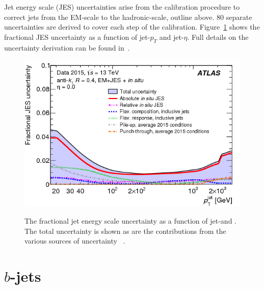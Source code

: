 Jet energy scale (JES) uncertainties arise from the calibration procedure
to correct jets from the EM-scale to the hadronic-scale, outline above.
80 separate uncertainties are derived to cover each step of the calibration.
Figure~\ref{fig:obj-jets_calib_JES} shows the fractional JES uncertainty as a function of jet-$p_T$ and jet-$\eta$.
Full details on the uncertainty derivation can be found in~\cite{obj-jets_calib_run2}.

\begin{figure}[!ht]
  \begin{center}
    \captionsetup[subfigure]{aboveskip=0pt,justification=centering}
     {\includegraphics[width=0.48\linewidth, angle=0]{figs/Objects/jets_uncert_JES_pt.png} }
  \end{center}
  \caption[The fractional jet energy scale uncertainty as a function of jet-\pT and \eta.
    The total uncertainty is shown as are the contributions from the various sources of uncertainty.]
          {The fractional jet energy scale uncertainty as a function of jet-\pT and \eta.
            The total uncertainty is shown as are the contributions from the various sources of uncertainty ~\cite{obj-jets_calib_run2}.}
  \label{fig:obj-jets_calib_JES}
\end{figure}

\FloatBarrier

\newpage
\section{$b$-jets}
\label{sec:obj-bjets}

